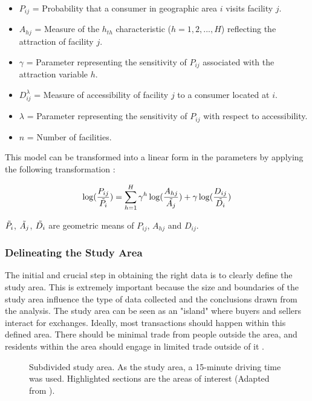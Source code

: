 \begin{itemize}
    \item $P_{ij}$ = Probability that a consumer in geographic area $i$ visits facility $j$.
    \item $A_{hj}$ = Measure of the $h_{th}$ characteristic ($h = 1,2,...,H$) reflecting the attraction of facility $j$.
    \item $\gamma$ = Parameter representing the sensitivity of $P_{ij}$ associated with the attraction variable $h$.
    \item $D_{ij}^\lambda$ = Measure of accessibility of facility $j$ to a consumer located at $i$.
    \item $\lambda$ = Parameter representing the sensitivity of $P_{ij}$ with respect to accessibility.
    \item $n$ = Number of facilities.
\end{itemize}

This model can be transformed into a linear form in the parameters by applying the
following transformation \cite{huff2008calibrating}:

\begin{equation}
    \log(\frac{P_{ij}}{\Tilde{P_{i}}}) = \sum_{h=1}^H \gamma^h \log(\frac{A_{hj}}{\Tilde{A_j}}) + \gamma \log(\frac{D_{ij}}{\Tilde{D_i}})
    \label{eq:huff-linear}
\end{equation}

$\Tilde{P_i}$, $\Tilde{A_j}$, $\Tilde{D_i}$ are geometric means of $P_{ij}$, $A_{hj}$ and $D_{ij}$.


\subsubsection{Delineating the Study Area}
\label{label:delineating-the-study-area}

The initial and crucial step in obtaining the right data is to clearly define the study area. This is extremely important because the size and boundaries of the study area influence the type of data collected and the conclusions drawn from the analysis. The study area can be seen as an "island" where buyers and sellers interact for exchanges. Ideally, most transactions should happen within this defined area. There should be minimal trade from people outside the area, and residents within the area should engage in limited trade outside of it \cite{huff2008calibrating}.

\begin{figure}[ht]
	\centering
	
	\caption{Subdivided study area. As the study area, a 15-minute driving time was used. Highlighted sections are the areas of interest (Adapted from \cite{huff2008calibrating}).}
	\label{fig:study-area-subdivided}
\end{figure}

